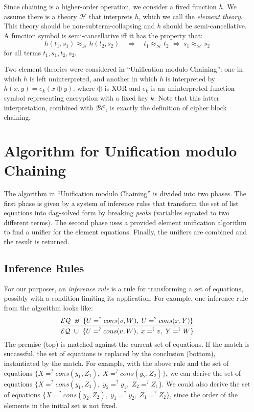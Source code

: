 \documentclass[11pt]{article}
\newcommand{\ueq}{=_{}^?}
\newcommand{\BC}{\mathcal{BC}}
\newcommand{\HH}{\mathcal{H}}
\newcommand{\EQ}{\mathcal{EQ}}
\newcommand{\Hh}{\mathit{h}}
\begin{document}
Since chaining is a higher-order operation, we consider a fixed function $\Hh$.
We assume there is a theory $\HH$ that interprets $\Hh$, which we call the
\emph{element theory}. This theory should be non-subterm-collapsing and
$\Hh$ should be semi-cancellative. A function symbol is semi-cancellative iff
it has the property that:
\[ \Hh(t_1, s_1) \approx_\HH^{} \Hh(t_2, s_2) \quad \Rightarrow \quad
t_1 \approx_\HH^{} t_2 \; \Leftrightarrow \; s_1 \approx_\HH^{} s_2 \]
for all terms $t_1, s_1, t_2, s_2$.

Two element theories were considered in ``Unification modulo Chaining'': one in
which $\Hh$ is left uninterpreted, and another in which $\Hh$ is interpreted by
$\Hh(x, y) = e_k(x \oplus y)$, where $\oplus$ is XOR and $e_k$ is an
uninterpreted function symbol representing encryption with a fixed key $k$.
Note that this latter interpretation, combined with $\BC$, is exactly the
definition of cipher block chaining.

\section{Algorithm for Unification modulo Chaining}\label{section:algorithm}

The algorithm in ``Unification modulo Chaining'' is divided into two phases.
The first phase is given by a system of inference rules that transform the
set of list equations into dag-solved form by breaking \emph{peaks} (variables
equated to two different terms). The second phase uses a provided
element unification algorithm to find a unifier for the element equations.
Finally, the unifiers are combined and the result is returned.

\subsection{Inference Rules}\label{subsection:inference}

For our purposes, an \emph{inference rule} is a rule for transforming a set of
equations, possibly with a condition limiting its application. For example, one
inference rule from the algorithm looks like:
\[\infer
    {\EQ ~ \cup ~ \{ U \ueq cons(v, W), \; x \ueq v, \; Y \ueq W \}}
    {\EQ ~ \uplus ~ \{ U \ueq cons(v, W), \; U \ueq cons(x, Y) \}}
\]
The premise (top) is matched against the current set of equations. If
the match is successful, the set of equations is replaced by the conclusion
(bottom), instantiated by the match. For example, with the above rule and
the set of equations $\{ X \ueq cons(y_1, Z_1), \; X \ueq cons(y_2, Z_2) \}$,
we can derive the set of equations $\{ X \ueq cons(y_1, Z_1), \; y_2 \ueq y_1,
\; Z_2 \ueq Z_1 \}$. We could also derive the set of equations $\{ X \ueq
cons(y_2, Z_2), \; y_1 \ueq y_2, \; Z_1 \ueq Z_2 \}$, since the order of the
elements in the initial set is not fixed.
\end{document}
